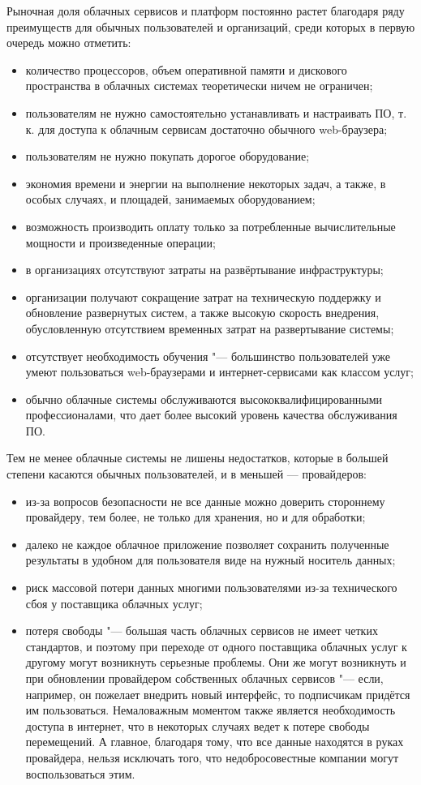 \documentclass[a5paper,10pt]{article}
\begin{document}
Рыночная доля облачных сервисов и платформ постоянно растет благодаря ряду преимуществ для обычных пользователей и организаций, среди которых в первую очередь можно отметить:
\begin{itemize}
\item	количество процессоров, объем оперативной памяти и дискового пространства в облачных системах теоретически ничем не ограничен;
\item	пользователям не нужно самостоятельно устанавливать и настраивать ПО, т.\,к. для доступа к облачным сервисам достаточно обычного web-браузера;
\item	пользователям не нужно покупать дорогое оборудование;
\item	экономия времени и энергии на выполнение некоторых задач, а также, в особых случаях, и площадей, занимаемых оборудованием;
\item	возможность производить оплату только за потребленные вычислительные мощности и произведенные операции;
\item	в организациях отсутствуют затраты на развёртывание инфраструктуры;
\item	организации получают сокращение затрат на техническую поддержку и обновление развернутых систем, а также высокую скорость внедрения, обусловленную отсутствием временных затрат на развертывание системы;
\item	отсутствует необходимость обучения "--- большинство пользователей уже умеют пользоваться web-браузерами и интернет-сервисами как классом услуг;
\item	обычно облачные системы обслуживаются высококвалифицированными профессионалами, что дает более высокий уровень качества обслуживания ПО.
\end{itemize}

Тем не менее облачные системы не лишены недостатков, которые в большей степени касаются обычных пользователей, и в меньшей --- провайдеров:
\begin{itemize}
\item из-за вопросов безопасности не все данные можно доверить стороннему провайдеру, тем более, не только для хранения, но и для обработки;
\item далеко не каждое облачное приложение позволяет сохранить полученные результаты в удобном для пользователя виде на нужный носитель данных;
\item риск массовой потери данных многими пользователями из-за технического сбоя у поставщика облачных услуг;
\item потеря свободы "--- большая часть облачных сервисов не имеет четких стандартов, и поэтому при переходе от одного поставщика облачных услуг к другому могут возникнуть серьезные проблемы. Они же могут возникнуть и при обновлении провайдером собственных облачных сервисов "--- если, например, он пожелает внедрить новый интерфейс, то подписчикам придётся им пользоваться.  Немаловажным моментом также является необходимость доступа в интернет, что в некоторых случаях ведет к потере свободы перемещений. А главное, благодаря тому, что все данные находятся в руках провайдера, нельзя исключать того, что недобросовестные компании могут воспользоваться этим.
\end{itemize}
\end{document}
